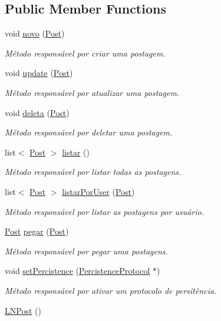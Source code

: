 \subsection*{Public Member Functions}
\begin{DoxyCompactItemize}
\item 
void \hyperlink{class_l_n_post_a3ab3b83674e572c7a8c645c8ea6f447d}{novo} (\hyperlink{class_post}{Post})
\begin{DoxyCompactList}\small\item\em Método responsável por criar uma postagem. \end{DoxyCompactList}\item 
void \hyperlink{class_l_n_post_a76e4575cc5e542510c1f135f879e88f5}{update} (\hyperlink{class_post}{Post})
\begin{DoxyCompactList}\small\item\em Método responsável por atualizar uma postagem. \end{DoxyCompactList}\item 
void \hyperlink{class_l_n_post_a24a5694180c400a4f75b05e3cc2b1b49}{deleta} (\hyperlink{class_post}{Post})
\begin{DoxyCompactList}\small\item\em Método responsável por deletar uma postagem. \end{DoxyCompactList}\item 
list$<$ \hyperlink{class_post}{Post} $>$ \hyperlink{class_l_n_post_adb8838a2a49afbc84d17ea8fc4773c7b}{listar} ()
\begin{DoxyCompactList}\small\item\em Método responsável por listar todas as postagens. \end{DoxyCompactList}\item 
list$<$ \hyperlink{class_post}{Post} $>$ \hyperlink{class_l_n_post_ad57f97108f666b1c2cc512e8301bc659}{listar\-Por\-User} (\hyperlink{class_post}{Post})
\begin{DoxyCompactList}\small\item\em Método responsável por listar as postagens por usuário. \end{DoxyCompactList}\item 
\hyperlink{class_post}{Post} \hyperlink{class_l_n_post_acb5f1b004c87e6cc34afa3890ff09682}{pegar} (\hyperlink{class_post}{Post})
\begin{DoxyCompactList}\small\item\em Método responsável por pegar uma postagens. \end{DoxyCompactList}\item 
void \hyperlink{class_l_n_post_a0f45810ec3c120b544810d9408d013e9}{set\-Percistence} (\hyperlink{class_percistence_protocol}{Percistence\-Protocol} $\ast$)
\begin{DoxyCompactList}\small\item\em Método responsável por ativar um protocolo de persitência. \end{DoxyCompactList}\item 
\hypertarget{class_l_n_post_ad3ca792ffe30c002e26008c5d85061eb}{\hyperlink{class_l_n_post_ad3ca792ffe30c002e26008c5d85061eb}{L\-N\-Post} ()}\label{class_l_n_post_ad3ca792ffe30c002e26008c5d85061eb}


\end{DoxyCompactItemize}
